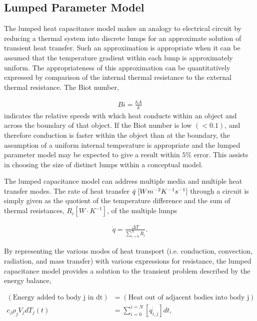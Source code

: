 \subsection{Lumped Parameter Model}
\label{sec:lumpedparam}

The lumped heat capacitance model makes an analogy to electrical circuit by 
reducing a thermal system into discrete lumps for an approximate solution of 
transient heat transfer. Such an approximation is 
appropriate when it can be assumed that the temperature gradient within each 
lump is approximately uniform. The appropriateness of this approximation can be
quantitatively expressed by comparison of the internal thermal resistance to the 
external thermal resistance. The Biot number, 

\begin{align}
  Bi = \frac{hA}{k}
  \label{biot}
\end{align}
indicates the relative speeds with which heat conducts within an object and 
across the boundary of that object. If the Biot number is low $(<0.1)$, and 
therefore conduction is faster within the object than at the boundary, the 
assumption of a uniform internal temperature is appropriate and the lumped 
parameter model may be expected to give a result within $5\%$ 
error\cite{incropera_fundamentals_2006}. This assists in choosing the size of 
distinct lumps within a conceptual model. 

The lumped capacitance model can address multiple media and multiple heat
transfer modes. The rate of heat transfer $\dot{q}\hspace{1mm}[Wm^{-2}K^{-1}s^{-1}]$ 
through a circuit is simply given as the quotient of the temperature 
difference and the sum of thermal resistances, $R_i [W\cdot K^{-1}]$,
of the multiple lumps 

\begin{align}
  \dot{q} = \frac{\Delta T}{\sum _{i=0}^{N}R_i}.
\end{align}

By representing the various modes of heat transport (i.e. conduction, 
convection, radiation, and mass transfer) with various expressions for 
resistance, the lumped capacitance model provides a solution to the transient 
problem described by the energy balance,

\begin{align}
  \left( \mbox{Energy added to body j in dt} \right) &= \left( \mbox{Heat 
  out of adjacent bodies into body j} \right)\nonumber\\
  c_j\rho_j V_j dT_j(t) &= \sum_{i=0}^{i=N}\left[\dot{q_{i,j}}\right]dt,
\end{align}


